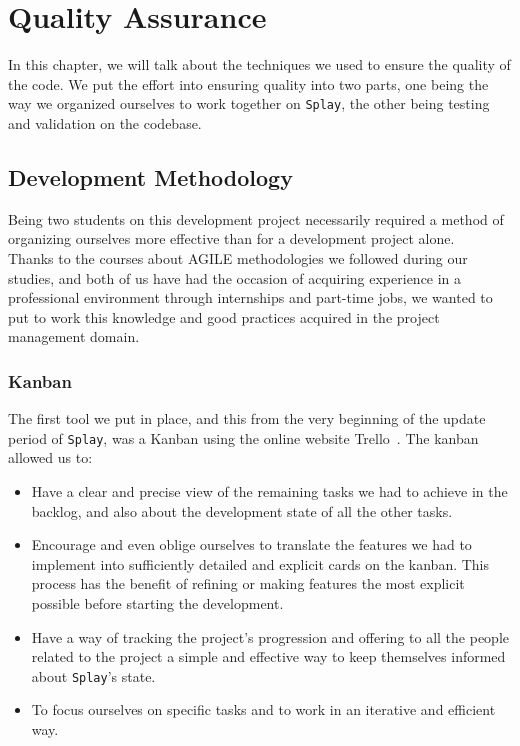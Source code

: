 \documentclass{eplmastersthesis}
\begin{document}
  \chapter{Quality Assurance}
  \label{chap:qual}

    In this chapter, we will talk about the techniques we used to ensure the
    quality of the code. We put the effort into ensuring quality into two
    parts, one being the way we organized ourselves to work together on \texttt{Splay},
    the other being testing and validation on the codebase.

    \section{Development Methodology}

      Being two students on this development project necessarily required a
      method of organizing ourselves more effective than for a development
      project alone.\\

      Thanks to the courses about AGILE methodologies we followed during our
      studies, and both of us have had the occasion of acquiring
      experience in a professional environment through internships and part-time jobs,
      we wanted to put to work this knowledge and good practices acquired in
      the project management domain.

        \subsection{Kanban}

          The first tool we put in place, and this from the very beginning of
          the update period of \texttt{Splay}, was a Kanban using the online website
          Trello~\cite{trello}. The kanban allowed us to: \\

          \begin{itemize}
            \item Have a clear and precise view of the remaining tasks we had
            to achieve in the backlog, and also about the development state of
            all the other tasks.
            \item Encourage and even oblige ourselves to translate the features
            we had to implement into sufficiently detailed and explicit cards on
            the kanban. This process has the benefit of refining or making
            features the most explicit possible before starting the development.
            \item Have a way of tracking the project's progression and offering
            to all the people related to the project a simple and effective way
            to keep themselves informed about \texttt{Splay}'s state.
            \item To focus ourselves on specific tasks and to work in an
            iterative and efficient way.
          \end{itemize}
\end{document}
